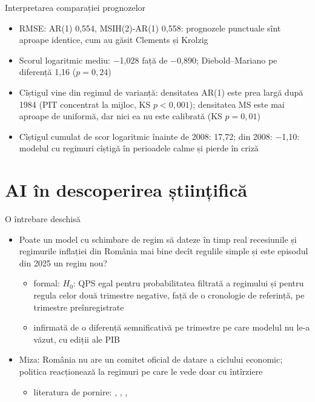 \begin{frame}{Interpretarea comparației prognozelor}
\itemsize{\small}
\begin{itemize}
    \item RMSE: AR(1) 0{,}554, MSIH(2)-AR(1) 0{,}558: prognozele punctuale sînt aproape identice, cum au găsit Clements și Krolzig
    \item Scorul logaritmic mediu: \ensuremath{-}1{,}028 față de \ensuremath{-}0{,}890; Diebold--Mariano pe diferență 1{,}16 ($p = 0{,}24$)
    \item Cîștigul vine din regimul de varianță: densitatea AR(1) este prea largă după 1984 (PIT concentrat la mijloc, KS $p < 0{,}001$); densitatea MS este mai aproape de uniformă, dar nici ea nu este calibrată (KS $p = 0{,}01$)
    \item Cîștigul cumulat de scor logaritmic înainte de 2008: 17{,}72; din 2008: \ensuremath{-}1{,}10: modelul cu regimuri cîștigă în perioadele calme și pierde în criză
\end{itemize}
\end{frame}


\section{AI în descoperirea științifică}

\begin{frame}{O întrebare deschisă}
\itemsize{\small}
\begin{itemize}
    \item Poate un model cu schimbare de regim să dateze în timp real recesiunile și regimurile inflației din România mai bine decît regulile simple și este episodul din 2025 un regim nou?
    \begin{itemize}
        \item formal: $H_0$: QPS egal pentru probabilitatea filtrată a regimului și pentru regula celor două trimestre negative, față de o cronologie de referință, pe trimestre preînregistrate
        \item infirmată de o diferență semnificativă pe trimestre pe care modelul nu le-a văzut, cu ediții ale PIB
    \end{itemize}
    \item Miza: România nu are un comitet oficial de datare a ciclului economic; politica reacționează la regimuri pe care le vede doar cu întîrziere
    \begin{itemize}
        \item literatura de pornire: , , , 
    \end{itemize}
\end{itemize}
\end{frame}


